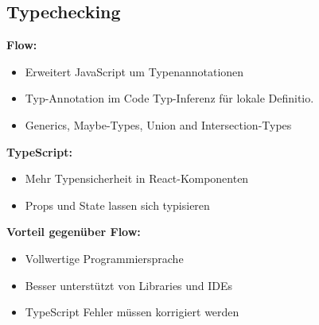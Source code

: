 \subsection{Typechecking}
\textcolor{b}{\textbf{Flow:}}
\begin{itemize}[topsep=0pt, leftmargin=3mm]
  \setlength\itemsep{-0.3em}
  \item Erweitert JavaScript um Typenannotationen
  \item Typ-Annotation im Code Typ-Inferenz für lokale Definitio.
  \item Generics, Maybe-Types, Union and Intersection-Types
\end{itemize}
\textcolor{b}{\textbf{TypeScript:}}
\begin{itemize}[topsep=0pt, leftmargin=3mm]
  \setlength\itemsep{-0.3em}
  \item Mehr Typensicherheit in React-Komponenten
  \item Props und State lassen sich typisieren
\end{itemize}
\textcolor{b}{\textbf{Vorteil gegenüber Flow:}}
\begin{itemize}[topsep=0pt, leftmargin=3mm]
  \setlength\itemsep{-0.3em}
  \item Vollwertige Programmiersprache
  \item Besser unterstützt von Libraries und IDEs
  \item TypeScript Fehler müssen korrigiert werden
\end{itemize}

